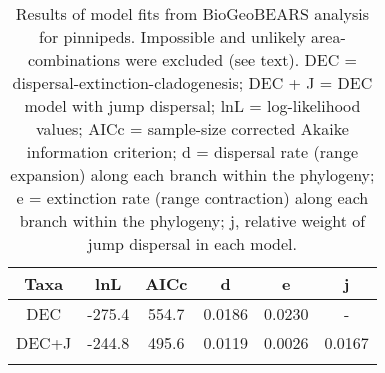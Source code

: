\begin{longtable}{cccccc}

\caption{Results of model fits from BioGeoBEARS analysis for pinnipeds. Impossible and unlikely area-combinations were excluded (see text). DEC = dispersal-extinction-cladogenesis; DEC + J = DEC model with jump dispersal; lnL = log-likelihood values; AICc = sample-size corrected Akaike information criterion; d = dispersal rate (range expansion) along each branch within the phylogeny; e = extinction rate (range contraction) along each branch within the phylogeny; j, relative weight of jump dispersal in each model.
}\\

\hline
\textbf{Taxa} & 
\textbf{lnL} &
\textbf{AICc} &
\textbf{d}&
\textbf{e} &
\textbf{j}\\
\hline
DEC &
-275.4 &
554.7 &
0.0186 &
0.0230 &
-\\

DEC+J &
-244.8 &
495.6 &
0.0119 &
0.0026 &
0.0167\\

\hline

\label{table-unlikely}
\end{longtable}